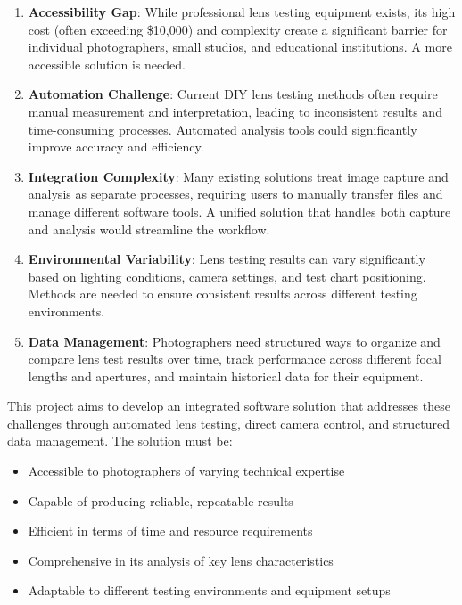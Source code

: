 \begin{enumerate}
    \item \textbf{Accessibility Gap}: While professional lens testing equipment exists, its high cost (often exceeding \$10,000) and complexity create a significant barrier for individual photographers, small studios, and educational institutions. A more accessible solution is needed.
    
    \item \textbf{Automation Challenge}: Current DIY lens testing methods often require manual measurement and interpretation, leading to inconsistent results and time-consuming processes. Automated analysis tools could significantly improve accuracy and efficiency.
    
    \item \textbf{Integration Complexity}: Many existing solutions treat image capture and analysis as separate processes, requiring users to manually transfer files and manage different software tools. A unified solution that handles both capture and analysis would streamline the workflow.
    
    \item \textbf{Environmental Variability}: Lens testing results can vary significantly based on lighting conditions, camera settings, and test chart positioning. Methods are needed to ensure consistent results across different testing environments.
    
    \item \textbf{Data Management}: Photographers need structured ways to organize and compare lens test results over time, track performance across different focal lengths and apertures, and maintain historical data for their equipment.
\end{enumerate}

This project aims to develop an integrated software solution that addresses these challenges through automated lens testing, direct camera control, and structured data management. The solution must be:

\begin{itemize}
    \item Accessible to photographers of varying technical expertise
    \item Capable of producing reliable, repeatable results
    \item Efficient in terms of time and resource requirements
    \item Comprehensive in its analysis of key lens characteristics
    \item Adaptable to different testing environments and equipment setups
\end{itemize}

